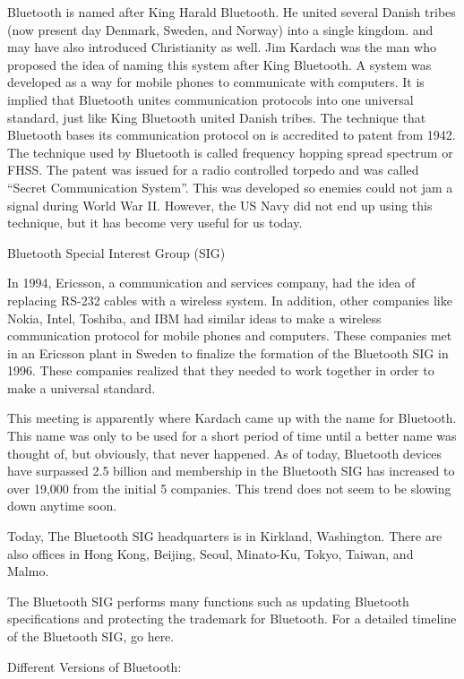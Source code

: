 \documentclass[11pt,a4paper]{article}
\begin{document}
	 {Bluetooth is named after King Harald Bluetooth. He united several Danish tribes (now present day Denmark, Sweden, and Norway) into a single kingdom. and may have also introduced Christianity as well. Jim Kardach was the man who proposed the idea of naming this system after King Bluetooth. A system was developed as a way for mobile phones to communicate with computers. It is implied that Bluetooth unites communication protocols into one universal standard, just like King Bluetooth united Danish tribes.
	 The technique that Bluetooth bases its communication protocol on is accredited to patent from 1942. The technique used by Bluetooth is called frequency hopping spread spectrum or FHSS. The patent was issued for a radio controlled torpedo and was called “Secret Communication System”. This was developed so enemies could not jam a signal during World War II. However, the US Navy did not end up using this technique, but it has become very useful for us today.

Bluetooth Special Interest Group (SIG)

In 1994, Ericsson, a communication and services company, had the idea of replacing RS-232 cables with a wireless system. In addition, other companies like Nokia, Intel, Toshiba, and IBM had similar ideas to make a wireless communication protocol for mobile phones and computers. These companies met in an Ericsson plant in Sweden to finalize the formation of the Bluetooth SIG in 1996. These companies realized that they needed to work together in order to make a universal standard.

This meeting is apparently where Kardach came up with the name for Bluetooth. This name was only to be used for a short period of time until a better name was thought of, but obviously, that never happened. As of today, Bluetooth devices have surpassed 2.5 billion and membership in the Bluetooth SIG has increased to over 19,000 from the initial 5 companies. This trend does not seem to be slowing down anytime soon.

Today, The Bluetooth SIG headquarters is in Kirkland, Washington. There are also offices in Hong Kong, Beijing, Seoul, Minato-Ku, Tokyo, Taiwan, and Malmo.

The Bluetooth SIG performs many functions such as updating Bluetooth specifications and protecting the trademark for Bluetooth. For a detailed timeline of the Bluetooth SIG, go here.

Different Versions of Bluetooth:
\begin{itemize}


\end{itemize}}
\end{document}
